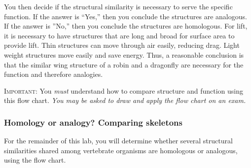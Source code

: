 \documentclass[12pt, hidelinks]{exam}
\begin{document}
You then decide if the structural similarity is necessary to serve the specific function. 
If the answer is “Yes,” then you conclude the structures are analogous. If the answer is
”No,” then you conclude the structures are homologous. For lift, it is necessary to have
structures that are long and broad for surface area to provide lift. Thin structures can
move through air easily, reducing drag. Light weight structures move easily and
save energy. Thus, a reasonable conclusion is that the similar wing structure of
a robin and a dragonfly are necessary for the function and therefore analogies.

\textsc{Important:} You \emph{must} understand how to compare structure and function
using this flow chart. \emph{You may be asked to draw and apply the flow chart on an exam.}

\subsubsection*{Homology or analogy? Comparing skeletons}

For the remainder of this lab, you will determine whether several structural similarities
shared among vertebrate organisms are homologous or analogous, using the flow chart.
\end{document}
